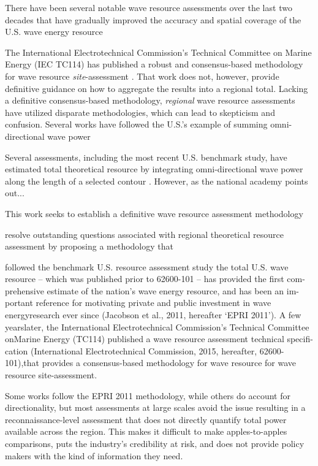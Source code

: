 There have been several notable wave resource assessments over the last two decades that have gradually improved the accuracy and spatial coverage of the U.S. wave energy resource \citep[]{EPRIwaveresource2011, bedardE2IEPRIAssessment2004, garcia-medinaWaveResourceAssessment20}

The International Electrotechnical Commission's Technical Committee on
Marine Energy (IEC TC114) has published a robust and consensus-based methodology for wave resource {\em site}-assessment \citep[][hereafter, 62600-101]{internationalelectrotechnicalcommissionPart101Wave2015}. That work does not, however, provide definitive guidance on how to aggregate the results into a regional total. Lacking a definitive consensus-based methodology, {\em regional} wave resource assessments have utilized disparate methodologies, which can lead to skepticism and confusion. Several works have followed the U.S.'s example of summing omni-directional wave power 



Several assessments, including the most recent U.S. benchmark study, have estimated total theoretical resource by integrating omni-directional wave power along the length of a selected contour \citep[]{}. However, as the national academy points out...



This work seeks to establish a definitive wave resource assessment methodology 

resolve outstanding questions associated with regional theoretical resource assessment by proposing a methodology that 

followed the benchmark U.S. resource assessment study the total U.S. wave resource -- which was published prior to 62600-101 -- has provided the first com-prehensive estimate of the nation’s wave energy resource, and has been an im-portant reference for motivating private and public investment in wave energyresearch ever since (Jacobson et al., 2011, hereafter ‘EPRI 2011’).  A few yearslater, the International Electrotechnical Commission’s Technical Committee onMarine Energy (TC114) published a wave resource assessment technical specifi-cation (International Electrotechnical Commission, 2015, hereafter, 62600-101),that  provides  a  consensus-based  methodology  for  wave  resource  for  wave  resource site-assessment.

Some works follow the EPRI 2011 methodology, while others do account for directionality, but most assessments at large scales avoid the issue resulting in a reconnaissance-level assessment that does not directly quantify total power available across the region. This makes it difficult to make apples-to-apples comparisons, puts the industry’s credibility at risk, and does not provide policy makers with the kind of information they need. 

